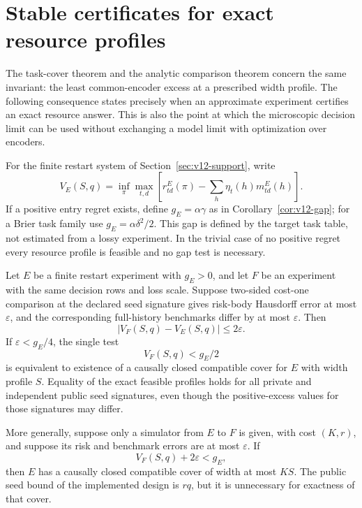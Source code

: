 \section{Stable certificates for exact resource profiles}
\label{sec:v12-certificates}

The task-cover theorem and the analytic comparison theorem concern the
same invariant: the least common-encoder excess at a prescribed width
profile. The following consequence states precisely when an approximate
experiment certifies an exact resource answer. This is also the point at
which the microscopic decision limit can be used without exchanging a
model limit with optimization over encoders.

For the finite restart system of Section~\ref{sec:v12-support}, write
\[
 V_E(S,q)=\inf_\pi\max_{t,d}
  \left[r^E_{td}(\pi)-\sum_h\eta_t(h)m^E_{td}(h)\right].
\]
If a positive entry regret exists, define $g_E=\alpha\gamma$ as in
Corollary~\ref{cor:v12-gap}; for a Brier task family use
$g_E=\alpha\delta^2/2$. This gap is defined by the target task table, not
estimated from a lossy experiment. In the trivial case of no positive
regret every resource profile is feasible and no gap test is necessary.

\begin{theorem}
\label{thm:v12-certificate}
Let $E$ be a finite restart experiment with $g_E>0$, and let $F$ be an
experiment with the same decision rows and loss scale. Suppose two-sided
cost-one comparison at the declared seed signature gives risk-body
Hausdorff error at most $\varepsilon$, and the corresponding full-history
benchmarks differ by at most $\varepsilon$. Then
\begin{equation}
 |V_F(S,q)-V_E(S,q)|\le2\varepsilon.
 \label{eq:v12-certificate-error}
\end{equation}
If $\varepsilon<g_E/4$, the single test
\begin{equation}
 V_F(S,q)<g_E/2
 \label{eq:v12-test}
\end{equation}
is equivalent to existence of a causally closed compatible cover for $E$
with width profile $S$. Equality of the exact feasible profiles holds for
all private and independent public seed signatures, even though the
positive-excess values for those signatures may differ.

More generally, suppose only a simulator from $E$ to $F$ is given, with
cost $(K,r)$, and suppose its risk and benchmark errors are at most
$\varepsilon$. If
\[
 V_F(S,q)+2\varepsilon<g_E,
\]
then $E$ has a causally closed compatible cover of width at most $KS$.
The public seed bound of the implemented design is $rq$, but it is
unnecessary for exactness of that cover.
\end{theorem}

